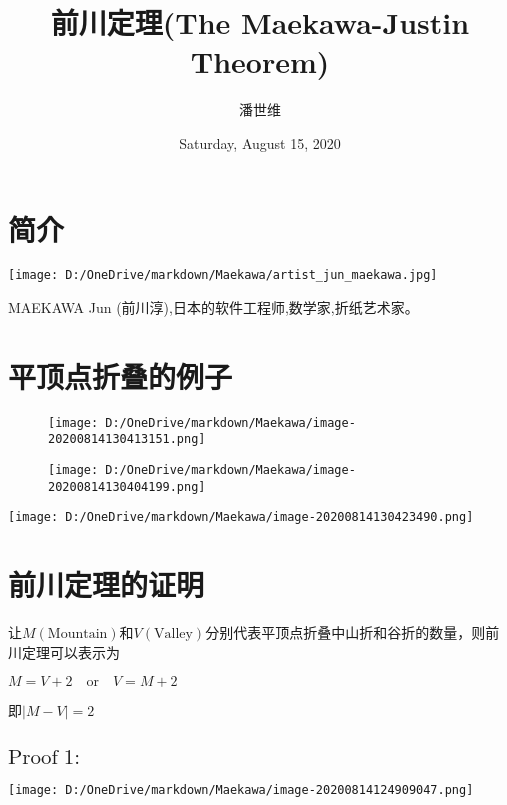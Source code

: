 \documentclass[a4paper,12pt]{article}
\begin{document}
\title {前川定理(The Maekawa-Justin Theorem)}
\author{潘世维}
\date{Saturday, August 15, 2020}
\maketitle
\section{简介} 
\texttt{[image: D:/OneDrive/markdown/Maekawa/artist\_jun\_maekawa.jpg]}

MAEKAWA Jun (前川淳),日本的软件工程师,数学家,折纸艺术家。

\section{平顶点折叠的例子}  
\begin{flushright}
\begin{figure}[h]
    \centering 
    \begin{minipage}{0.4\linewidth}
    \centering    %
    \texttt{[image: D:/OneDrive/markdown/Maekawa/image-20200814130413151.png]}	 
    \caption{}
    \end{minipage}
    \hfill
    \begin{minipage}{0.4\linewidth}
    \centering    %
    \texttt{[image: D:/OneDrive/markdown/Maekawa/image-20200814130404199.png]}
    \caption{}
    \end{minipage}
\end{figure}
\end{flushright}




\begin{center}
    \texttt{[image: D:/OneDrive/markdown/Maekawa/image-20200814130423490.png]}

\end{center}


\section{前川定理的证明\cite{demaine2007geometric}}
让$M(\text{Mountain})$和$V(\text{Valley})$分别代表平顶点折叠中山折和谷折的数量，则前川定理可以表示为

$M = V +2 \quad \text{or}\quad V = M + 2$

即$|M-V|=2$

\subsection{$\text{Proof}\;1:$}
\begin{center}
\texttt{[image: D:/OneDrive/markdown/Maekawa/image-20200814124909047.png]}
\end{center}
\end{document}
